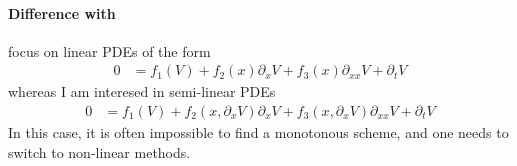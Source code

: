 \documentclass[english]{article}
\begin{document}
	\paragraph{Difference with \citet{achdou2014heterogeneous}} 	 \citet{achdou2014heterogeneous} focus on linear PDEs of the form
	\begin{align*}
		0&=f_1(V)  + f_2(x) \partial_x V  + f_3(x) \partial_{xx} V + \partial_t V
	\end{align*}
	whereas I am interesed in semi-linear PDEs
	\begin{align*}
		0&=f_1(V)  + f_2(x, \partial_x V) \partial_x V  + f_3(x, \partial_x V) \partial_{xx} V + \partial_t V
	\end{align*}
	In this case, it is often impossible to find a monotonous scheme, and one needs to switch to non-linear methods.



		
	
	
\end{document}
